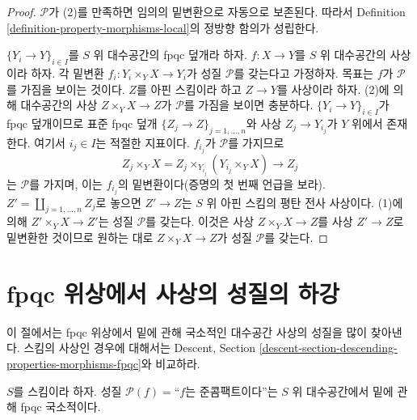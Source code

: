 \begin{proof}
$\mathcal{P}$가 (2)를 만족하면 임의의 밑변환으로 자동으로 보존된다.
따라서 Definition \ref{definition-property-morphisms-local}의 정방향 함의가
성립한다.

\medskip\noindent
$\{Y_i\to Y\}_{i\in I}$를 $S$ 위 대수공간의 fpqc 덮개라 하자.
$f:X\to Y$를 $S$ 위 대수공간의 사상이라 하자. 각 밑변환
$f_i:Y_i\times_YX\to Y_i$가 성질 $\mathcal{P}$를 갖는다고 가정하자.
목표는 $f$가 $\mathcal{P}$를 가짐을 보이는 것이다. $Z$를 아핀
스킴이라 하고 $Z\to Y$를 사상이라 하자. (2)에 의해 대수공간의 사상
$Z\times_YX\to Z$가 $\mathcal{P}$를 가짐을 보이면 충분하다.
$\{Y_i\to Y\}_{i\in I}$가 fpqc 덮개이므로 표준 fpqc 덮개
$\{Z_j\to Z\}_{j=1,\ldots,n}$와 사상 $Z_j\to Y_{i_j}$가 $Y$ 위에서
존재한다. 여기서 $i_j\in I$는 적절한 지표이다. $f_{i_j}$가
$\mathcal{P}$를 가지므로
$$
Z_j \times_Y X
=
Z_j \times_{Y_{i_j}} (Y_{i_j} \times_Y X)
\longrightarrow
Z_j
$$
는 $\mathcal{P}$를 가지며, 이는 $f_{i_j}$의 밑변환이다(증명의 첫 번째
언급을 보라). $Z'=\coprod_{j=1,\ldots,n}Z_j$로 놓으면 $Z'\to Z$는
$S$ 위 아핀 스킴의 평탄 전사 사상이다. (1)에 의해
$Z'\times_YX\to Z'$는 성질 $\mathcal{P}$를 갖는다. 이것은 사상
$Z\times_YX\to Z$를 사상 $Z'\to Z$로 밑변환한 것이므로 원하는 대로
$Z\times_YX\to Z$가 성질 $\mathcal{P}$를 갖는다.
\end{proof}

\section{fpqc 위상에서 사상의 성질의 하강}
\label{section-descending-properties-morphisms-fpqc}

\noindent
이 절에서는 fpqc 위상에서 밑에 관해 국소적인 대수공간 사상의 성질을
많이 찾아낸다. 스킴의 사상인 경우에 대해서는 Descent, Section
\ref{descent-section-descending-properties-morphisms-fpqc}와 비교하라.

\begin{lemma}
\label{lemma-descending-property-quasi-compact}
$S$를 스킴이라 하자. 성질 $\mathcal{P}(f)=$``$f$는 준콤팩트이다''는
$S$ 위 대수공간에서 밑에 관해 fpqc 국소적이다.
\end{lemma}

